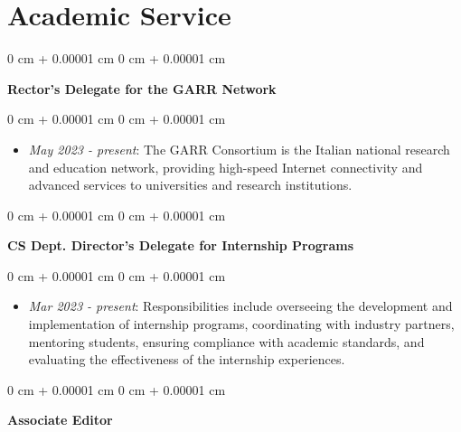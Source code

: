\documentclass[10pt, a4paper]{article}
\newenvironment{highlights}{
    \begin{itemize}[
        topsep=0.10 cm,
        parsep=0.10 cm,
        partopsep=0pt,
        itemsep=0pt,
        leftmargin=0 cm + 10pt
    ]
}{
    \end{itemize}
} %
\newenvironment{onecolentry}{
    \begin{adjustwidth}{
        0 cm + 0.00001 cm
    }{
        0 cm + 0.00001 cm
    }
}{
    \end{adjustwidth}
} %
\begin{document}
    
    \section{Academic Service}



        
        \begin{onecolentry}
            \textbf{Rector’s Delegate for the GARR Network}\end{onecolentry}

        \vspace{0.10 cm}
        \begin{onecolentry}
            \begin{highlights}
                \item \textit{May 2023 - present}: The GARR Consortium is the Italian national research and education network, providing high-speed Internet connectivity and advanced services to universities and research institutions.
            \end{highlights}
        \end{onecolentry}


        \vspace{0.2 cm}

        \begin{onecolentry}
            \textbf{CS Dept. Director’s Delegate for Internship Programs}\end{onecolentry}

        \vspace{0.10 cm}
        \begin{onecolentry}
            \begin{highlights}
                \item \textit{Mar 2023 - present}: Responsibilities include overseeing the development and implementation of internship programs, coordinating with industry partners, mentoring students, ensuring compliance with academic standards, and evaluating the effectiveness of the internship experiences.
            \end{highlights}
        \end{onecolentry}


        \vspace{0.2 cm}

        \begin{onecolentry}
            \textbf{Associate Editor}\end{onecolentry}
\end{document}
